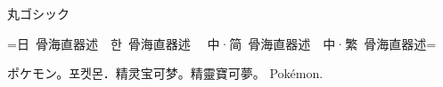 \documentclass[dvipdfmx]{ujarticle}
\begin{document}
{\mgfamily
  {\mdseries
    丸ゴシック\par
    =日~骨海直器述~~\foreignlanguage{korean}{한~骨海直器述}%
    ~~\foreignlanguage{schinese}{中·简~骨海直器述}~~\foreignlanguage{tchinese}{中·繁~骨海直器述}=\par
    ポケモン。\foreignlanguage{korean}{포켓몬．}\foreignlanguage{schinese}{精灵宝可梦。}\foreignlanguage{tchinese}{精靈寶可夢。} Pokémon.
    \par}}
\end{document}
